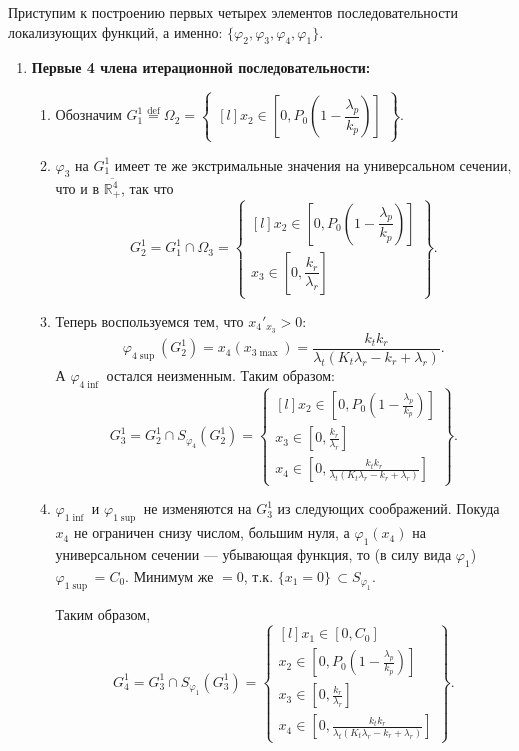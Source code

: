 \documentclass[12pt,a4paper]{article}
\newcommand{\eqdef}{\stackrel{\text{def}}{=}}
\newcommand{\xin}[3]{x_{#1} \in \left[ #2, #3 \right]}
\newcommand{\set}[1]{
    \left\{ \begin{matrix*}[l] #1 \end{matrix*}     
    \right\}   
    }
\begin{document}
Приступим к построению первых четырех элементов последовательности локализующих функций, а именно: $\{\varphi_2, \varphi_3, \varphi_4, \varphi_1\}$.

\begin{enumerate}
    
    \item \textbf{Первые 4 члена итерационной последовательности:}

    \begin{enumerate}
        
        \item Обозначим $ G_1^1 \eqdef \Omega_2 =
            \set{\xin{2}{0}{P_0\left( 1 - \dfrac{\lambda_p}{k_p} \right)}} $. 

        \item $\varphi_3$ на $G_1^1$ имеет те же экстримальные значения на универсальном сечении, что и в $\overline{\mathbb{R}_{+}^{4}}$, так что
        $$G_2^1 = G_1^1 \cap \Omega_3 = \set{
            \xin{2}{0}{P_0\left( 1 - \dfrac{\lambda_p}{k_p} \right)} \\
            \xin{3}{0}{\dfrac{k_r}{\lambda_r}}
        }.
        $$

        \item Теперь воспользуемся тем, что ${x_4}'_{x_3} > 0:$ 
        $$\varphi_{4 \sup}(G_2^1) = x_4(x_{3 \max}) = 
            \dfrac{k_t k_r}{\lambda_t(K_t \lambda_r - k_r + \lambda_r)}.
        $$
        А $\varphi_{4 \inf}$ остался неизменным. Таким образом:
        $$G_3^1 = G_2^1 \cap S_{\varphi_4}(G_2^1) = \set{
            \xin{2}{0}{P_0\left( 1 - \frac{\lambda_p}{k_p} \right)} \\
            \xin{3}{0}{\frac{k_r}{\lambda_r}} \\
            \xin{4}{0}{\frac{k_t k_r}{\lambda_t(K_t \lambda_r - k_r + \lambda_r)}}
        }.
        $$

        \item $\varphi_{1 \inf}$ и $\varphi_{1 \sup}$ не изменяются на $G_3^1$ из следующих соображений. Покуда $x_4$ не ограничен снизу числом, большим нуля, а $\varphi_{1}(x_4)$ на универсальном сечении --- убывающая функция, то (в силу вида $\varphi_{1}$) $\varphi_{1 \sup} = C_0$. Минимум же $= 0$, т.к. $\{x_1 = 0\}\,\subset S_{\varphi_1}$.
        
        Таким образом, 
        $$G_4^1 = G_3^1 \cap S_{\varphi_1}(G_3^1) = \set{
            \xin{1}{0}{ C_0 } \\
            \xin{2}{0}{P_0\left( 1 - \frac{\lambda_p}{k_p} \right)} \\
            \xin{3}{0}{\frac{k_r}{\lambda_r}} \\
            \xin{4}{0}{\frac{k_t k_r}{\lambda_t(K_t \lambda_r - k_r + \lambda_r)}}
        }.
        $$
    \end{enumerate}
    

\end{enumerate}
\end{document}
